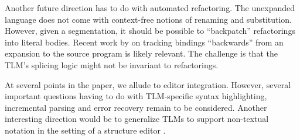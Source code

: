 \documentclass[acmsmall]{acmart}
\begin{document}

Another future direction has to do with automated refactoring. The unexpanded language does not come with context-free notions of renaming and substitution. However, given a segmentation, it should be possible to ``backpatch'' refactorings into literal bodies. Recent work by \citet{wand2017inferring} on tracking bindings ``backwards'' from an expansion to the source program is likely relevant. The challenge is that the TLM's splicing logic might not be invariant to refactorings.

At several points in the paper, we allude to editor integration. However, several important questions having to do with TLM-specific syntax highlighting, incremental parsing and error recovery \cite{graham1979practical} remain to be considered. Another interesting direction would be to generalize TLMs to support non-textual notation in the setting of a structure editor \cite{DBLP:conf/popl/OmarVHAH17}.


\end{document}
